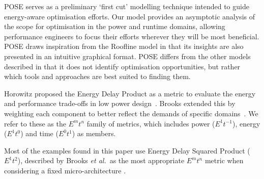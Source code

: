 POSE serves as a preliminary `first cut' modelling technique intended to guide energy-aware optimisation efforts.
Our model provides an asymptotic analysis of the scope for optimisation in the power and runtime domains, allowing performance engineers to focus their efforts wherever they will be most beneficial.
POSE draws inspiration from the Roofline model in that its insights are also presented in an intuitive graphical format.
POSE differs from the other models described in that it does not identify optimisation opportunities, but rather which tools and approaches are best suited to finding them.  


Horowitz proposed the Energy Delay Product as a metric to evaluate the energy and performance trade-offs in low power design~\cite{horowitz:1994aa}.
Brooks extended this by weighting each component to better reflect the demands of specific domains~\cite{brooks:2000ab}.
We refer to these as the $E^mt^n$ family of metrics, which includes power ($E^1t^{-1}$), energy ($E^1t^0$) and time ($E^0t^1$) as members.

Most of the examples found in this paper use Energy Delay Squared Product ($E^1t^2$), described by Brooks \emph{et al.}\ as the most appropriate $E^mt^n$ metric when considering a fixed micro-architecture \cite{brooks:2000aa}.
